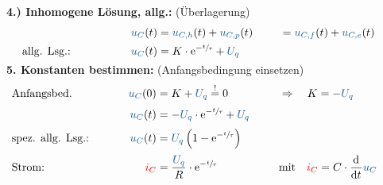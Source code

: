 {\begin{frame}
\textbf{4.) Inhomogene Lösung, allg.:} (Überlagerung)\\[-1em]
\begin{align*}
&&
    \ecv{u_C}(t) &= \ecv{u_{C,h}}(t) + \ecv{u_{C,p}}(t) &
    &= \ecv{u_{C,f}}(t) + \ecv{u_{C,e}}(t)  \\
&\text{allg. Lsg.:}&
    \ecv{u_C}(t) &= K \cdot \mathrm{e}^{-\sfrac{t}{\tau}} + \ecv{U_q}%
\\[-15pt]&\hphantom{R1oooooooooo}&\hphantom{L2oooooooo}&\hphantom{R2oooooooooooooooooo}&&\hphantom{R3oooooooooooooooooo}%
\end{align*}
\pause%
\textbf{5. Konstanten bestimmen:} (Anfangsbedingung einsetzen)\\[-1em]
\begin{align*}
&\text{Anfangsbed.}&
    \ecv{u_C}(0) &= K + \ecv{U_q} \overset{!}{=} 0 &
        &\Rightarrow\quad K = -\ecv{U_q} && \\[2pt]
&&
    \ecv{u_C}(t) &= -\ecv{U_q} \cdot \mathrm{e}^{-\sfrac{t}{\tau}} + \ecv{U_q} \\[2pt]
&\text{spez. allg. Lsg.:}&
    \ecv{u_C}(t) &= \ecv{U_q} \left( 1 - \mathrm{e}^{-\sfrac{t}{\tau}} \right) \\[2pt]
&\text{Strom: }&
    \eci{i_C} &= \frac{\ecv{U_q}}{R} \cdot \mathrm{e}^{-\sfrac{t}{\tau}} &
    &\text{mit}\quad \eci{i_C} = C \cdot \dt \ecv{u_C}
\\[-15pt]&\hphantom{R1oooooooooo}&\hphantom{L2oooooooo}&\hphantom{R2oooooooooooooooooo}&&\hphantom{R3oooooooooooooooooo}%
\end{align*}
\end{frame}
}%


